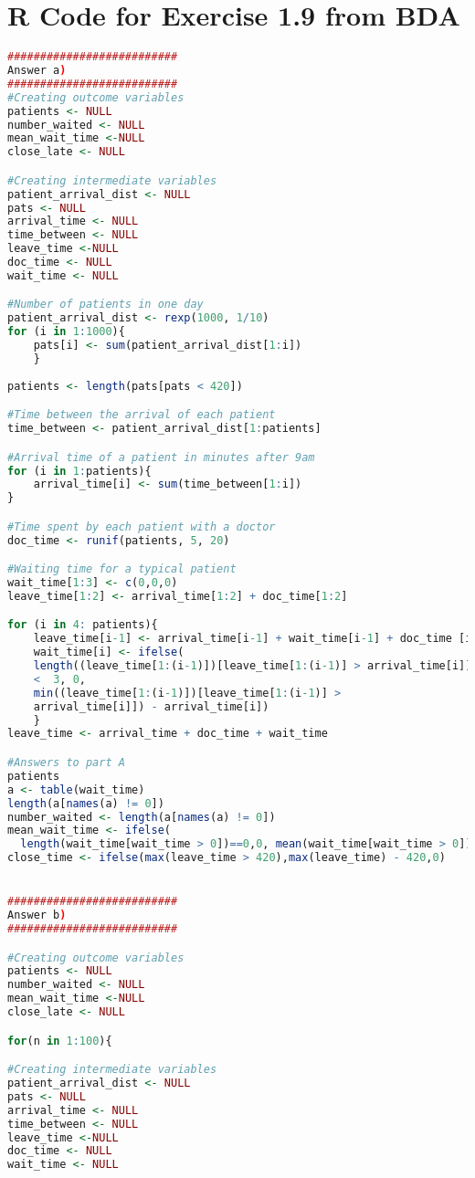 \documentclass{article}
\begin{document}
\section{R Code for Exercise 1.9 from BDA}
\begin{lstlisting}[language=R]
##########################
Answer a)
##########################
#Creating outcome variables
patients <- NULL
number_waited <- NULL
mean_wait_time <-NULL
close_late <- NULL

#Creating intermediate variables
patient_arrival_dist <- NULL
pats <- NULL
arrival_time <- NULL
time_between <- NULL
leave_time <-NULL
doc_time <- NULL
wait_time <- NULL

#Number of patients in one day
patient_arrival_dist <- rexp(1000, 1/10)
for (i in 1:1000){
	pats[i] <- sum(patient_arrival_dist[1:i])
	}
	
patients <- length(pats[pats < 420])

#Time between the arrival of each patient
time_between <- patient_arrival_dist[1:patients]

#Arrival time of a patient in minutes after 9am
for (i in 1:patients){
	arrival_time[i] <- sum(time_between[1:i])
}

#Time spent by each patient with a doctor
doc_time <- runif(patients, 5, 20)

#Waiting time for a typical patient
wait_time[1:3] <- c(0,0,0)
leave_time[1:2] <- arrival_time[1:2] + doc_time[1:2]

for (i in 4: patients){
	leave_time[i-1] <- arrival_time[i-1] + wait_time[i-1] + doc_time [i-1]
	wait_time[i] <- ifelse(
	length((leave_time[1:(i-1)])[leave_time[1:(i-1)] > arrival_time[i]]) 
	<  3, 0,
	min((leave_time[1:(i-1)])[leave_time[1:(i-1)] > 
	arrival_time[i]]) - arrival_time[i])
	}
leave_time <- arrival_time + doc_time + wait_time

#Answers to part A
patients
a <- table(wait_time)
length(a[names(a) != 0])
number_waited <- length(a[names(a) != 0])
mean_wait_time <- ifelse(
  length(wait_time[wait_time > 0])==0,0, mean(wait_time[wait_time > 0]))
close_time <- ifelse(max(leave_time > 420),max(leave_time) - 420,0)


##########################
Answer b)
##########################

#Creating outcome variables
patients <- NULL
number_waited <- NULL
mean_wait_time <-NULL
close_late <- NULL

for(n in 1:100){

#Creating intermediate variables
patient_arrival_dist <- NULL
pats <- NULL
arrival_time <- NULL
time_between <- NULL
leave_time <-NULL
doc_time <- NULL
wait_time <- NULL


\end{lstlisting}
\end{document}
